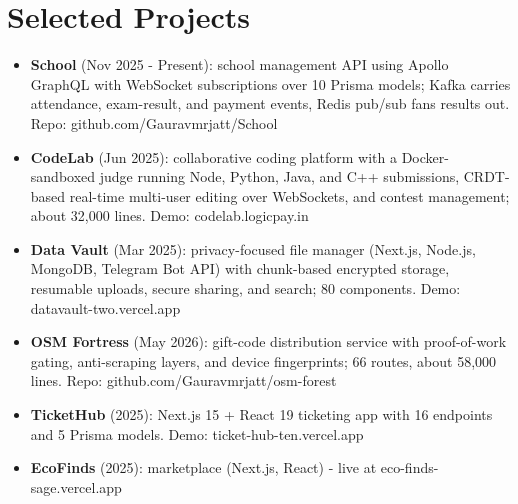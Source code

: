 \documentclass[11pt,a4paper,sans]{moderncv}
\begin{document}


\section{Selected Projects}
\vspace{1pt}
\begin{itemize}
    \item {\textbf{School} (Nov 2025 - Present): school management API using Apollo GraphQL with WebSocket subscriptions over 10 Prisma models; Kafka carries attendance, exam-result, and payment events, Redis pub/sub fans results out. Repo: github.com/Gauravmrjatt/School}
    \item {\textbf{CodeLab} (Jun 2025): collaborative coding platform with a Docker-sandboxed judge running Node, Python, Java, and C++ submissions, CRDT-based real-time multi-user editing over WebSockets, and contest management; about 32,000 lines. Demo: codelab.logicpay.in}
    \item {\textbf{Data Vault} (Mar 2025): privacy-focused file manager (Next.js, Node.js, MongoDB, Telegram Bot API) with chunk-based encrypted storage, resumable uploads, secure sharing, and search; 80 components. Demo: datavault-two.vercel.app}
    \item {\textbf{OSM Fortress} (May 2026): gift-code distribution service with proof-of-work gating, anti-scraping layers, and device fingerprints; 66 routes, about 58,000 lines. Repo: github.com/Gauravmrjatt/osm-forest}
    \item {\textbf{TicketHub} (2025): Next.js 15 + React 19 ticketing app with 16 endpoints and 5 Prisma models. Demo: ticket-hub-ten.vercel.app}
    \item {\textbf{EcoFinds} (2025): marketplace (Next.js, React) - live at eco-finds-sage.vercel.app}
\end{itemize}
\end{document}
